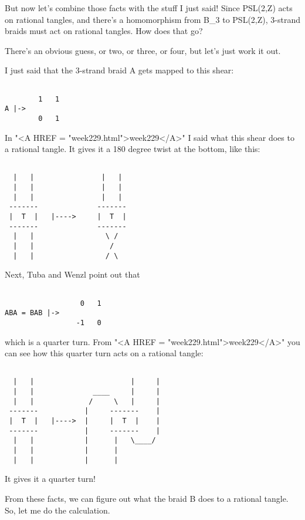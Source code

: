 But now let's combine those facts with the stuff I just said!  Since
PSL(2,Z) acts on rational tangles, and there's a homomorphism from
B_{3} to PSL(2,Z), 3-strand braids must act on rational
tangles.  How does that go?

There's an obvious guess, or two, or three, or four, but let's just
work it out.

I just said that the 3-strand braid A gets mapped to this shear:


\begin{verbatim}

        1   1
A |->  
        0   1
\end{verbatim}
    
In "<A HREF = "week229.html">week229</A>" I said what this
shear does to a rational tangle.  It gives it a 180 degree twist at
the bottom, like this:


\begin{verbatim}

  |   |                |   |
  |   |                |   |
  |   |                |   |
 -------              -------
 |  T  |   |---->     |  T  |        
 -------              -------
  |   |                 \ /
  |   |                  / 
  |   |                 / \
\end{verbatim}
    
Next, Tuba and Wenzl point out that


\begin{verbatim}

                  0   1
ABA = BAB |-> 
                 -1   0
\end{verbatim}
    

which is a quarter turn.  From "<A HREF =
"week229.html">week229</A>" you can see how this quarter turn
acts on a rational tangle:


\begin{verbatim}

  |   |                       |     | 
  |   |              ____     |     |
  |   |             /     \   |     |
 -------           |     -------    |
 |  T  |   |---->  |     |  T  |    |    
 -------           |     -------    |
  |   |            |      |   \____/
  |   |            |      |    
  |   |            |      |  
\end{verbatim}
    
It gives it a quarter turn!      

From these facts, we can figure out what the braid B does to a 
rational tangle.  So, let me do the calculation.  

